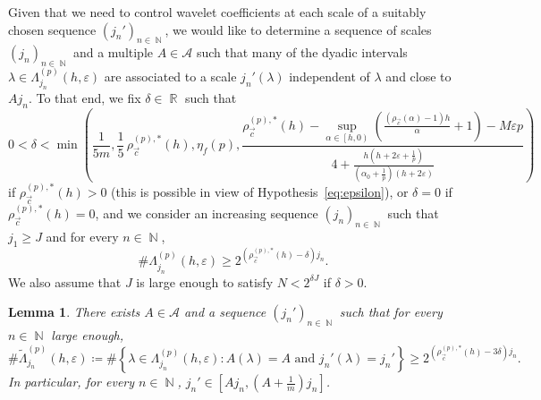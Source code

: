\documentclass[a4paper,11pt,oneside]{article}
\DeclareMathOperator{\R}{\mathbb{R}}
\DeclareMathOperator{\N}{\mathbb{N}}
\newcommand{\coint}[1]{\left[{#1}\right)}
\newcommand{\ccint}[1]{\left[{#1}\right]}
\theoremstyle{definition}
\theoremstyle{plain}
\newtheorem{lemma}[defi]{Lemma}
\begin{document}
Given that we need to control wavelet coefficients at each scale of a suitably chosen sequence $(j_n')_{n\in\N}$, we would like to determine a sequence of scales $(j_n)_{n\in\N}$ and a multiple $A\in\mathcal{A}$ such that many of the dyadic intervals $\lambda\in\Lambda_{j_n}^{(p)}(h,\varepsilon)$ are associated to a scale $j_n'(\lambda)$ independent of $\lambda$ and close to $Aj_n$. To that end, we fix $\delta\in\R$ such that 
\begin{equation}\label{eq:delta}
    0<\delta<\min\left(\frac{1}{5m},\frac{1}{5}\,\rho_{\vec{c}}^{(p),\ast}(h),\eta_f(p),\frac{\rho^{(p),\ast}_{\vec{c}}(h)-\displaystyle\sup_{\alpha\in\coint{h,0}}\left(\frac{(\rho_{\vec{c}}(\alpha)-1)h}{\alpha}+1\right)-M\varepsilon p}{4+\frac{h\left(h+2\varepsilon+\frac{1}{p}\right)}{\left(\alpha_0+\frac{1}{p}\right)(h+2\varepsilon)}}\right) 
\end{equation}
if $\rho_{\vec{c}}^{(p),\ast}(h)>0$ (this is possible in view of Hypothesis~\eqref{eq:epsilon}), or $\delta=0$ if $\rho_{\vec{c}}^{(p),\ast}(h)=0$, and we consider an increasing sequence $(j_n)_{n\in\N}$ such that $j_1\geq J$ and for every $n\in\N$,
\begin{equation}\label{card_Lambdap}
    \#\Lambda_{j_n}^{(p)}(h,\varepsilon)\geq 2^{\left(\rho_{\vec{c}}^{(p),\ast}(h)-\delta\right)j_n}. 
\end{equation}
We also assume that $J$ is large enough to satisfy $N<2^{\delta J}$ if $\delta>0$.

\begin{lemma}\label{lm:card_Lambdap}
    There exists $A\in\mathcal{A}$ and a sequence $(j_n')_{n\in\N}$ such that for every $n\in\N$ large enough,
    \[
        \#\widetilde{\Lambda}_{j_n}^{(p)}(h,\varepsilon) \coloneqq \#\left\{\lambda\in\Lambda_{j_n}^{(p)}(h,\varepsilon):A(\lambda)=A \text{ and }j_n'(\lambda)=j_n'\right\} \geq 2^{\left(\rho_{\vec{c}}^{(p),\ast}(h)-3\delta\right)j_n}.
    \]
    In particular, for every $n\in\N$, $j_n'\in\ccint{Aj_n,\left(A+\frac{1}{m}\right)j_n}$.
\end{lemma}
\end{document}
